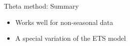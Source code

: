 \begin{frame}{Theta method: Summary}
	
	\begin{itemize}[<+->]
		\item Works well for \alert{non-seasonal} data
		\item A special \alert{variation} of the ETS model
	\end{itemize}
\end{frame}